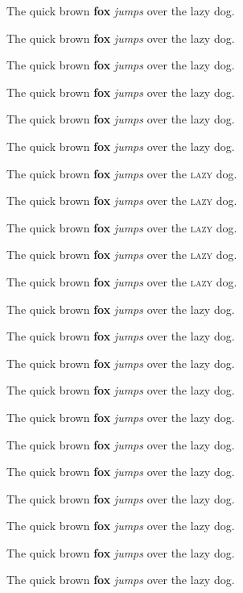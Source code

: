 \documentclass{article}
\begin{document}
\renewcommand\rmdefault{cantarell}
\rm
The quick brown \textbf{fox} \emph{jumps} over the lazy dog.

\renewcommand\rmdefault{cardo}
\rm
The quick brown \textbf{fox} \emph{jumps} over the lazy dog.

\renewcommand\rmdefault{crimson}
\rm
The quick brown \textbf{fox} \emph{jumps} over the lazy dog.

\renewcommand\rmdefault{droidserif}
\rm
The quick brown \textbf{fox} \emph{jumps} over the lazy dog.

\renewcommand\rmdefault{droidsans}
\rm
The quick brown \textbf{fox} \emph{jumps} over the lazy dog.

\renewcommand\rmdefault{droidmono}
\rm
The quick brown \textbf{fox} \emph{jumps} over the lazy dog.

\renewcommand\rmdefault{felldp}
\rm
The quick brown \textbf{fox} \emph{jumps} over the \textsc{lazy} dog.

\renewcommand\rmdefault{fellen}
\rm
The quick brown \textbf{fox} \emph{jumps} over the \textsc{lazy} dog.

\renewcommand\rmdefault{fellfc}
\rm
The quick brown \textbf{fox} \emph{jumps} over the \textsc{lazy} dog.

\renewcommand\rmdefault{fellgp}
\rm
The quick brown \textbf{fox} \emph{jumps} over the \textsc{lazy} dog.

\renewcommand\rmdefault{fellpi}
\rm
The quick brown \textbf{fox} \emph{jumps} over the \textsc{lazy} dog.


\renewcommand\rmdefault{inconsolata}
\rm
The quick brown \textbf{fox} \emph{jumps} over the lazy dog.

\renewcommand\rmdefault{josefin}
\rm
The quick brown \textbf{fox} \emph{jumps} over the lazy dog.

\renewcommand\rmdefault{kaffeesatz}
\rm
The quick brown \textbf{fox} \emph{jumps} over the lazy dog.

\renewcommand\rmdefault{lobster}
\rm
The quick brown \textbf{fox} \emph{jumps} over the lazy dog.

\renewcommand\rmdefault{molengo}
\rm
The quick brown \textbf{fox} \emph{jumps} over the lazy dog.

\renewcommand\rmdefault{nobile}
\rm
The quick brown \textbf{fox} \emph{jumps} over the lazy dog.

\renewcommand\rmdefault{oldstandard}
\rm
The quick brown \textbf{fox} \emph{jumps} over the lazy dog.

\renewcommand\rmdefault{reeniebeanie}
\rm
The quick brown \textbf{fox} \emph{jumps} over the lazy dog.

\renewcommand\rmdefault{sortsmillgoudy}
\rm
The quick brown \textbf{fox} \emph{jumps} over the lazy dog.

\renewcommand\rmdefault{tangerine}
\rm
The quick brown \textbf{fox} \emph{jumps} over the lazy dog.

\renewcommand\rmdefault{vollkorn}
\rm
The quick brown \textbf{fox} \emph{jumps} over the lazy dog.
\end{document}

